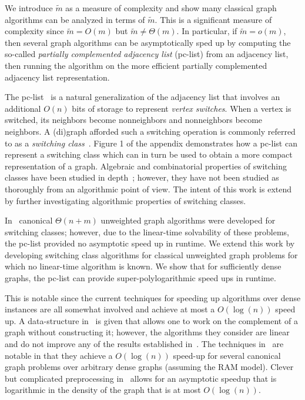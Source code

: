 \documentclass{llncs}
\begin{document}
We introduce $\widetilde{m}$ as a measure of complexity and show many classical graph algorithms can be analyzed in terms of $\widetilde{m}$.  This is a significant measure of complexity since $\widetilde{m} = O(m)$ but $\widetilde{m} \neq \Theta(m)$.  In particular, if $\widetilde{m} =  o(m)$, then several graph algorithms can be asymptotically sped up by computing the so-called \emph{partially complemented adjacency list}  (pc-list) from an adjacency list, then running the algorithm on the more efficient partially complemented adjacency list representation.  

The pc-list~\cite{DahlhausGM02} is a natural generalization of the adjacency list  that involves an additional $O(n)$ bits of storage to represent \emph{vertex switches}.  When a vertex is switched, its neighbors become nonneighbors and nonneighbors become neighbors.   A (di)graph afforded such a switching operation is commonly referred to as a \emph{switching class}~\cite{Seidel76}.  Figure 1 of the appendix demonstrates how a pc-list can represent a switching class which can in turn be used to obtain a more compact representation of a graph.  Algebraic and combinatorial properties of switching classes have been studied in depth~\cite{Seidel76,ChengW86}; however, they have not been studied as thoroughly from an algorithmic point of view.  The intent of this work is extend~\cite{DahlhausGM02} by further investigating algorithmic properties of switching classes.

In~\cite{DahlhausGM02} canonical $\Theta(n+m)$ unweighted graph algorithms were developed for switching classes; however, due to the linear-time solvability of these problems, the pc-list provided no asymptotic speed up in runtime.  We extend this work by developing switching class algorithms for classical unweighted graph problems for which no linear-time algorithm is known.  We show that for sufficiently dense graphs, the pc-list can provide super-polylogarithmic speed ups in runtime. 

This is notable since the current techniques for speeding up algorithms over dense instances are all somewhat involved and achieve at most a $O(\log(n))$ speed up.  A data-structure in~\cite{KaoOT98} is given that allows one to work on the complement of a graph without constructing it; however, the algorithms they consider are linear and do not improve any of the results established in~\cite{DahlhausGM02}.
The techniques in~\cite{CheriyanM96} are notable in that they achieve a $O(\log(n))$ speed-up for several canonical graph problems over arbitrary dense graphs (assuming the RAM model).  Clever but complicated preprocessing in~\cite{FederM95} allows for an asymptotic speedup that is logarithmic in the density of the graph that is at most $O(\log(n))$.  
\end{document}
